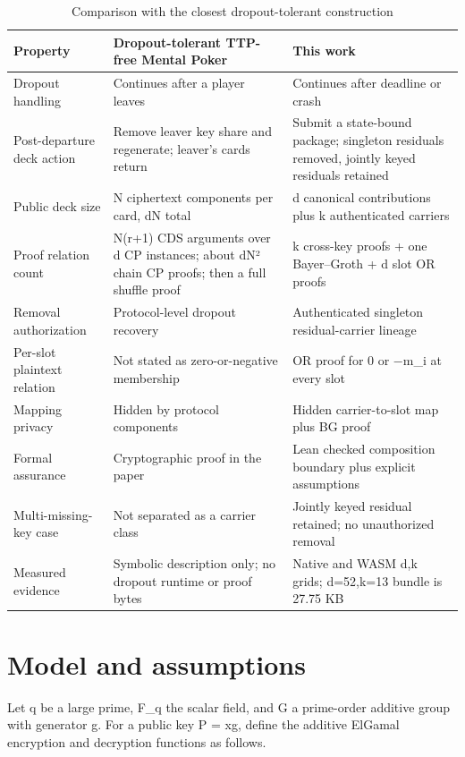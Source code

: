 \documentclass[11pt]{article}
\begin{document}
\begin{table}[htbp]
\centering
\footnotesize
\caption{Comparison with the closest dropout-tolerant construction}
\begin{tabularx}{\textwidth}{>{\RaggedRight}X >{\RaggedRight}X >{\RaggedRight}X}
\toprule
Property & Dropout-tolerant TTP-free Mental Poker \cite{ref7} & This work \\
\midrule
Dropout handling & Continues after a player leaves & Continues after deadline or crash \\
Post-departure deck action & Remove leaver key share and regenerate; leaver’s cards return & Submit a state-bound package; singleton residuals removed, jointly keyed residuals retained \\
Public deck size & N ciphertext components per card, dN total & d canonical contributions plus k authenticated carriers \\
Proof relation count & N(r+1) CDS arguments over d CP instances; about dN² chain CP proofs; then a full shuffle proof & k cross-key proofs + one Bayer–Groth + d slot OR proofs \\
Removal authorization & Protocol-level dropout recovery & Authenticated singleton residual-carrier lineage \\
Per-slot plaintext relation & Not stated as zero-or-negative membership & OR proof for 0 or −m\_i at every slot \\
Mapping privacy & Hidden by protocol components & Hidden carrier-to-slot map plus BG proof \\
Formal assurance & Cryptographic proof in the paper & Lean checked composition boundary plus explicit assumptions \\
Multi-missing-key case & Not separated as a carrier class & Jointly keyed residual retained; no unauthorized removal \\
Measured evidence & Symbolic description only; no dropout runtime or proof bytes & Native and WASM d,k grids; d=52,k=13 bundle is 27.75 KB \\
\bottomrule
\end{tabularx}
\end{table}

\section{Model and assumptions}

Let q be a large prime, F\_q the scalar field, and G a prime-order additive group with generator g. For a public key P = xg, define the additive ElGamal encryption and decryption functions as follows.
\end{document}
